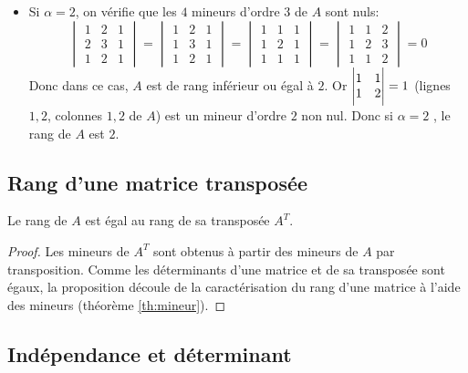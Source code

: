 \documentclass[class=report,crop=false]{standalone}
\begin{document}
\begin{exemple}
\begin{itemize}
  \item Si $\alpha =2$, on vérifie que les $4$ mineurs d'ordre $3$ de $A$ sont nuls:
  \[
  \begin{vmatrix} 1& 2&1 \\ 2&3&1 \\ 1& 2 & 1 \end{vmatrix}
  = \begin{vmatrix} 1 & 2&1 \\ 1&3&1 \\ 1& 2 & 1 \end{vmatrix}
  = \begin{vmatrix} 1 & 1& 1 \\ 1&2&1 \\ 1&1& 1 \end{vmatrix}
  = \begin{vmatrix} 1 & 1& 2 \\ 1&2&3 \\ 1&1& 2 \end{vmatrix}
  = 0
  \] Donc dans ce cas,  $A$ est de rang inférieur ou égal à $2$.
Or
$\Bigg| \begin{matrix}
1 & 1 \cr
1 & 2 \cr
\end{matrix} \Bigg| = 1$ (lignes $1,2$, colonnes $1,2$ de $A$)
est un mineur d'ordre $2$ non nul. Donc si $\alpha = 2$ , le rang de $A$ est $2$.
\end{itemize}
\end{exemple}


\subsection{Rang d'une matrice transposée}

\begin{proposition}
Le rang de $A$ est égal au rang de sa transposée $A^T$.
\end{proposition}

\begin{proof}
Les mineurs de $A^{T}$ sont obtenus à partir des mineurs de $A$ par
transposition. Comme les déterminants d'une matrice et de sa
transposée sont égaux, la proposition découle de la
caractérisation du rang d'une matrice à l'aide des mineurs
(théorème \ref{th:mineur}).
\end{proof}


\subsection{Indépendance et déterminant} 	\label{sec:independence-et-det}
\end{document}
